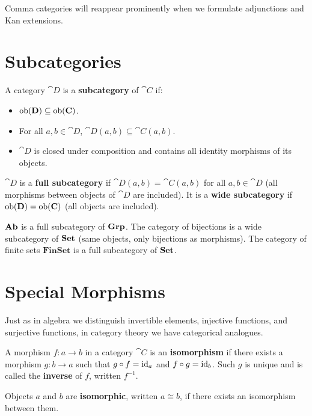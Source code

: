 Comma categories will reappear prominently when we formulate adjunctions and Kan extensions.

\section{Subcategories}

\begin{definition}[Subcategory]
A category $\cat{D}$ is a \textbf{subcategory} of $\cat{C}$ if:
\begin{itemize}
  \item $\operatorname{ob}(\mathbf{D}) \subseteq \operatorname{ob}(\mathbf{C})$.
  \item For all $a, b \in \cat{D}$, $\cat{D}(a,b) \subseteq \cat{C}(a,b)$.
  \item $\cat{D}$ is closed under composition and contains all identity morphisms of its objects.
\end{itemize}
$\cat{D}$ is a \textbf{full subcategory} if $\cat{D}(a,b) = \cat{C}(a,b)$ for all $a, b \in \cat{D}$ (all morphisms between objects of $\cat{D}$ are included). It is a \textbf{wide subcategory} if $\operatorname{ob}(\mathbf{D}) = \operatorname{ob}(\mathbf{C})$ (all objects are included).
\end{definition}

\begin{example}
$\mathbf{Ab}$ is a full subcategory of $\mathbf{Grp}$. The category of bijections is a wide subcategory of $\mathbf{Set}$ (same objects, only bijections as morphisms). The category of finite sets $\mathbf{FinSet}$ is a full subcategory of $\mathbf{Set}$.
\end{example}

\section{Special Morphisms}
\label{sec:special-morphisms}

Just as in algebra we distinguish invertible elements, injective functions, and surjective functions, in category theory we have categorical analogues.

\begin{definition}[Isomorphism]
A morphism $f: a \to b$ in a category $\cat{C}$ is an \textbf{isomorphism} if there exists a morphism $g: b \to a$ such that $g \circ f = \mathrm{id}_a$ and $f \circ g = \mathrm{id}_b$. Such $g$ is unique and is called the \textbf{inverse} of $f$, written $f^{-1}$.

Objects $a$ and $b$ are \textbf{isomorphic}, written $a \cong b$, if there exists an isomorphism between them.
\end{definition}

